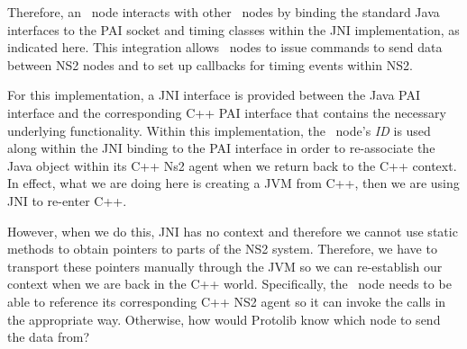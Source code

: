 Therefore, an \agentj~node interacts with other \agentj~nodes
by binding the standard Java interfaces to the PAI
socket and timing classes within the JNI implementation, as
indicated here. This integration allows \agentj~nodes to issue
commands to send data between NS2 nodes and to set up callbacks
for timing events within NS2.

For this implementation, a JNI interface is provided
between the Java PAI interface and the corresponding C++ PAI
interface that contains the necessary underlying
functionality. Within this implementation, the \agentj~node's
\emph{ID} is used along within the JNI binding to the
PAI interface in order to re-associate the Java object within its
C++ Ns2 agent when we return back to the C++ context.
In effect, what we are doing here is creating a JVM from C++,
then we are using JNI to re-enter C++.

However, when we do
this, JNI has no context and therefore we cannot use static
methods to obtain pointers to parts of the NS2 system. Therefore,
we have to transport these pointers manually through the JVM
so we can re-establish our context when we are back in the
C++ world. Specifically, the \agentj~node needs to be able to
reference its corresponding C++ NS2 agent so it can invoke
the calls in the appropriate way. Otherwise, how would Protolib
know which node to send the data from?